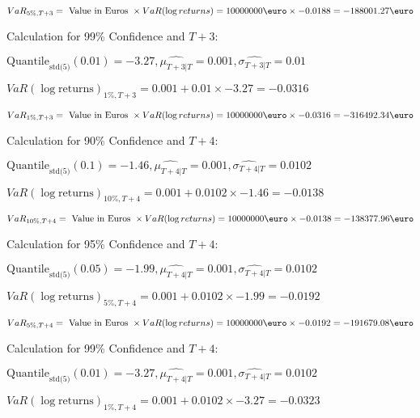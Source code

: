 \indent\indent $VaR_{5\%, T + 3} = \text{ Value in Euros } \times VaR(\log returns) = 10 000 000 \text{\euro} \times-0.0188 = -188001.27 \text{\euro}$\newline




Calculation for 99\% Confidence and $T+3$:

\indent\indent $\text{Quantile}_\text{std(5)}(0.01) = -3.27,\hat{\mu_{T+3|T}} = 0.001, \hat{\sigma_{T+3|T}} = 0.01$

\indent\indent $VaR(\log \text{returns})_{1\%, T + 3} = 0.001 + 0.01\times-3.27 = -0.0316$

\indent\indent $VaR_{1\%, T + 3} = \text{ Value in Euros } \times VaR(\log returns) = 10 000 000 \text{\euro} \times-0.0316 = -316492.34 \text{\euro}$\newline




Calculation for 90\% Confidence and $T+4$:

\indent\indent $\text{Quantile}_\text{std(5)}(0.1) = -1.46,\hat{\mu_{T+4|T}} = 0.001, \hat{\sigma_{T+4|T}} = 0.0102$

\indent\indent $VaR(\log \text{returns})_{10\%, T + 4} = 0.001 + 0.0102\times-1.46 = -0.0138$

\indent\indent $VaR_{10\%, T + 4} = \text{ Value in Euros } \times VaR(\log returns) = 10 000 000 \text{\euro} \times-0.0138 = -138377.96 \text{\euro}$\newline




Calculation for 95\% Confidence and $T+4$:

\indent\indent $\text{Quantile}_\text{std(5)}(0.05) = -1.99,\hat{\mu_{T+4|T}} = 0.001, \hat{\sigma_{T+4|T}} = 0.0102$

\indent\indent $VaR(\log \text{returns})_{5\%, T + 4} = 0.001 + 0.0102\times-1.99 = -0.0192$

\indent\indent $VaR_{5\%, T + 4} = \text{ Value in Euros } \times VaR(\log returns) = 10 000 000 \text{\euro} \times-0.0192 = -191679.08 \text{\euro}$\newline




Calculation for 99\% Confidence and $T+4$:

\indent\indent $\text{Quantile}_\text{std(5)}(0.01) = -3.27,\hat{\mu_{T+4|T}} = 0.001, \hat{\sigma_{T+4|T}} = 0.0102$

\indent\indent $VaR(\log \text{returns})_{1\%, T + 4} = 0.001 + 0.0102\times-3.27 = -0.0323$

